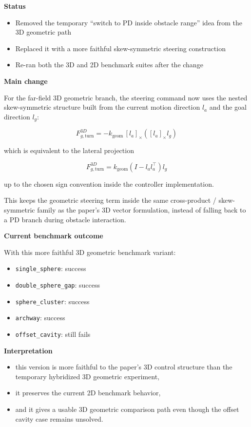 \documentclass[11pt]{article}
\begin{document}
\textbf{Status}

\begin{itemize}[leftmargin=*]
  \item Removed the temporary ``switch to PD inside obstacle range'' idea from the 3D geometric path
  \item Replaced it with a more faithful skew-symmetric steering construction
  \item Re-ran both the 3D and 2D benchmark suites after the change
\end{itemize}

\textbf{Main change}

For the far-field 3D geometric branch, the steering command now uses the nested
skew-symmetric structure built from the current motion direction \(l_a\) and the
goal direction \(l_g\):

\begin{equation}
F_{g,\text{turn}}^{3D}
=
-k_{\text{geom}}
\,[l_a]_{\times}
\left([l_a]_{\times} l_g\right)
\end{equation}

which is equivalent to the lateral projection

\begin{equation}
F_{g,\text{turn}}^{3D}
=
k_{\text{geom}}
\left(I - l_a l_a^\top\right) l_g
\end{equation}

up to the chosen sign convention inside the controller implementation.

This keeps the geometric steering term inside the same cross-product /
skew-symmetric family as the paper's 3D vector formulation, instead of falling
back to a PD branch during obstacle interaction.

\textbf{Current benchmark outcome}

With this more faithful 3D geometric benchmark variant:

\begin{itemize}[leftmargin=*]
  \item \texttt{single\_sphere}: success
  \item \texttt{double\_sphere\_gap}: success
  \item \texttt{sphere\_cluster}: success
  \item \texttt{archway}: success
  \item \texttt{offset\_cavity}: still fails
\end{itemize}

\textbf{Interpretation}

\begin{itemize}[leftmargin=*]
  \item this version is more faithful to the paper's 3D control structure than the temporary hybridized 3D geometric experiment,
  \item it preserves the current 2D benchmark behavior,
  \item and it gives a usable 3D geometric comparison path even though the offset cavity case remains unsolved.
\end{itemize}
\end{document}
